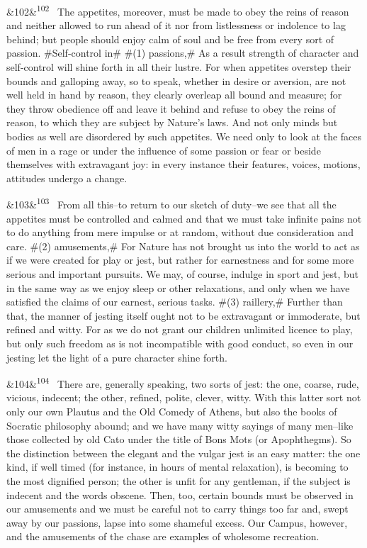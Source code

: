 \documentclass[12pt]{article}
\newcommand{\para}[1][]{\par\noindent\ifx&#1&\else\textsuperscript{\footnotesize #1}~\fi}
\begin{document}
\para[102] The appetites, moreover, must be made to obey the reins of reason and neither allowed to run ahead of it nor from listlessness or indolence to lag behind; but people should enjoy calm of soul and be free from every sort of passion. \#Self-control in\# \#(1) passions,\# As a result strength of character and self-control will shine forth in all their lustre. For when appetites overstep their bounds and galloping away, so to speak, whether in desire or aversion, are not well held in hand by reason, they clearly overleap all bound and measure; for they throw obedience off and leave it behind and refuse to obey the reins of reason, to which they are subject by Nature's laws. And not only minds but bodies as well are disordered by such appetites. We need only to look at the faces of men in a rage or under the influence of some passion or fear or beside themselves with extravagant joy: in every instance their features, voices, motions, attitudes undergo a change.

\para[103] From all this--to return to our sketch of duty--we see that all the appetites must be controlled and calmed and that we must take infinite pains not to do anything from mere impulse or at random, without due consideration and care. \#(2) amusements,\# For Nature has not brought us into the world to act as if we were created for play or jest, but rather for earnestness and for some more serious and important pursuits. We may, of course, indulge in sport and jest, but in the same way as we enjoy sleep or other relaxations, and only when we have satisfied the claims of our earnest, serious tasks. \#(3) raillery,\# Further than that, the manner of jesting itself ought not to be extravagant or immoderate, but refined and witty. For as we do not grant our children unlimited licence to play, but only such freedom as is not incompatible with good conduct, so even in our jesting let the light of a pure character shine forth.

\para[104] There are, generally speaking, two sorts of jest: the one, coarse, rude, vicious, indecent; the other, refined, polite, clever, witty. With this latter sort not only our own Plautus and the Old Comedy of Athens, but also the books of Socratic philosophy abound; and we have many witty sayings of many men--like those collected by old Cato under the title of Bons Mots (or Apophthegms). So the distinction between the elegant and the vulgar jest is an easy matter: the one kind, if well timed (for instance, in hours of mental relaxation), is becoming to the most dignified person; the other is unfit for any gentleman, if the subject is indecent and the words obscene. Then, too, certain bounds must be observed in our amusements and we must be careful not to carry things too far and, swept away by our passions, lapse into some shameful excess. Our Campus, however, and the amusements of the chase are examples of wholesome recreation.
\end{document}
